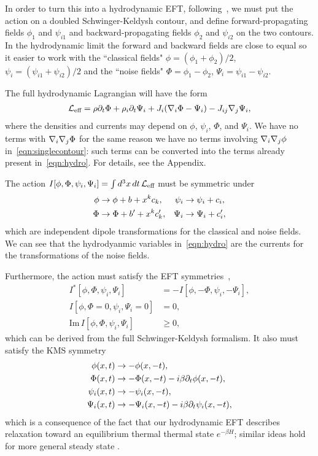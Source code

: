 In order to turn this into a hydrodynamic EFT, following~\cite{Liu2018Lectures}, we must put the action on a doubled Schwinger-Keldysh contour, and define forward-propagating fields $\phi_1$ and $\psi_{i1}$ and backward-propagating fields $\phi_2$ and $\psi_{i2}$ on the two contours. In the hydrodynamic limit the forward and backward fields are close to equal so it easier to work with the ``classical fields" $\phi = (\phi_1+\phi_2)/2$, $\psi_i = (\psi_{i1}+\psi_{i2})/2$ and the ``noise fields" $\Phi = \phi_1 - \phi_2$, $\Psi_i = \psi_{i1}-\psi_{i2}$.

The full hydrodynamic Lagrangian will have the form 
\begin{align}
\mathcal{L}_{\text{eff}} = \rho \partial_t \Phi + \rho_i \partial_t  \Psi_i + J_i (\nabla_i \Phi- \Psi_i) - J_{ij} \nabla_j\Psi_i, \label{eqn:hydro}
\end{align}
where the densities and currents may depend on $\phi$, $\psi_i$, $\Phi$, and $\Psi_i$. 
We have no terms with $\nabla_i\nabla_j \Phi$ for the same reason we have no terms involving $\nabla_i\nabla_j \phi$ in~\eqref{eqn:singlecontour}: such terms can be converted into the terms already present in~\eqref{eqn:hydro}. For details, see the Appendix.

The action $I[\phi, \Phi, \psi_i, \Psi_i] = \int d^3x\, dt\, \mathcal{L}_{\text{eff}}$ must be symmetric under
\begin{align}
\phi &\rightarrow \phi + b + x^k c_k, & \psi_i &\rightarrow \psi_i + c_i, \nonumber\\
\Phi &\rightarrow \Phi + b' + x^k c_k', & \Psi_i &\rightarrow \Psi_i + c'_i,
\end{align}
which are independent dipole transformations for the classical and noise fields. We can see that the hydrodyanmic variables in~\eqref{eqn:hydro} are the currents for the transformations of the noise fields. 

Furthermore, the action must satisfy the EFT symmetries~\cite{Liu2018Lectures},
\begin{align}
I^*[\phi, \Phi, \psi_i, \Psi_i] &= -I[\phi, -\Phi, \psi_i, -\Psi_i],\nonumber\\
I[\phi, \Phi=0, \psi_i, \Psi_i=0] &=0, \nonumber\\
\text{Im}\, I[\phi, \Phi, \psi_i, \Psi_i] &\ge 0, \label{eqn:eftsym}
\end{align}
which can be derived from the full Schwinger-Keldysh formalism. It also must satisfy the KMS symmetry
\begin{align}
\phi(x,t) &\rightarrow -\phi(x,-t), \nonumber\\
\Phi(x,t) &\rightarrow -\Phi(x,-t) - i\beta\partial_t \phi(x,-t), \nonumber\\
\psi_i(x,t) &\rightarrow -\psi_i(x,-t), \nonumber\\
\Psi_i(x,t) &\rightarrow -\Psi_i(x,-t) - i\beta \partial_t \psi_i(x,-t), \label{eqn:KMS}
\end{align}
which is a consequence of the fact that our hydrodynamic EFT describes relaxation toward an equilibrium thermal thermal state $e^{-\beta H}$; similar ideas hold for more general steady state \cite{Guo2022Fracton}.

